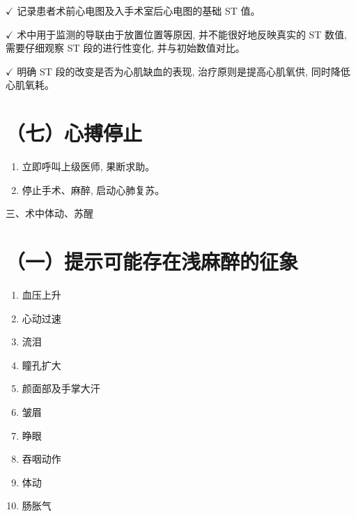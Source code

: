 \documentclass[10pt]{article}
\begin{document}
$\checkmark$ 记录患者术前心电图及入手术室后心电图的基础 ST 值。

$\checkmark$ 术中用于监测的导联由于放置位置等原因, 并不能很好地反映真实的 ST 数值, 需要仔细观察 ST 段的进行性变化, 并与初始数值对比。

$\checkmark$ 明确 ST 段的改变是否为心肌缺血的表现, 治疗原则是提高心肌氧供, 同时降低心肌氧耗。

\section*{（七）心搏停止}
\begin{enumerate}
  \item 立即呼叫上级医师, 果断求助。

  \item 停止手术、麻醉, 启动心肺复苏。

\end{enumerate}

三、术中体动、苏醒

\section*{（一）提示可能存在浅麻醉的征象}
\begin{enumerate}
  \item 血压上升

  \item 心动过速

  \item 流泪

  \item 瞳孔扩大

  \item 颜面部及手掌大汗

  \item 皱眉

  \item 睁眼

  \item 吞咽动作

  \item 体动

  \item 肠胀气

\end{enumerate}
\end{document}
